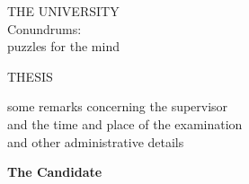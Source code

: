 \documentclass[letterpaper, 12pt]{report}
\newlength{\drop}%
\begin{document}
\pagestyle{empty}
\clearpage


\newcommand*{\titleMS}{\begingroup%
\drop=0.1\textheight
\vspace*{\drop}
\centering
{\LARGE THE UNIVERSITY}\\[2\baselineskip]
{\LARGE\sffamily Conundrums: \\ puzzles for the mind}\par
\vfill
{\LARGE THESIS}\par
\vspace{\drop}
{\large some remarks concerning the supervisor \\
and the time and place of the examination \\
and other administrative details}\par
\vfill
{\large\bfseries The Candidate}\par
\vspace*{\drop}
\endgroup}

\titleMS
\end{document}
